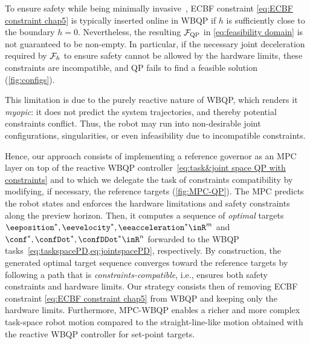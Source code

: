 To ensure  safety while being  minimally invasive~\cite{tan2021tac}, ECBF constraint \cref{eq:ECBF constraint chap5} is typically inserted online in   WBQP if $h$ is sufficiently close to the boundary $h=0$. 
Nevertheless, the resulting ${\cal F}_{\rm QP}$ in \cref{eq:feasibility domain} is not guaranteed to be non-empty. In particular, if the necessary joint deceleration required by ${\cal F}_{h}$ to ensure safety cannot be allowed by the hardware limits, these constraints are incompatible, and QP fails to find a feasible solution (\cref{fig:configs}).   

This limitation is due to the purely reactive nature of WBQP, which renders it \emph{myopic}: it does not predict the system trajectories, and thereby potential constraints conflict. Thus, the robot may run into non-desirable joint configurations, singularities, or even infeasibility due to incompatible constraints.
 

Hence, our approach consists of implementing a reference governor as an MPC layer on top of the reactive   WBQP controller~\eqref{eq:task&joint space QP with constraints} and to which we delegate the task of constraints compatibility by modifying, if necessary, the reference targets (\cref{fig:MPC-QP}). The MPC predicts the robot states and enforces the hardware limitations and safety constraints along the preview horizon. Then, it computes  a sequence of \emph{optimal} targets  $\eeposition^*,\eevelocity^*,\eeacceleration^*\inR^m$ and  $\conf^*,\confDot^*, \confDDot^*\inR^n$ forwarded to the   WBQP tasks~\cref{eq:taskspacePD,eq:jointspacePD}, respectively. By construction, the generated optimal target sequence converges toward the reference targets by following a path that is  \emph{constraints-compatible}, i.e., ensures both safety constraints and hardware limits. Our strategy consists then of removing ECBF constraint \cref{eq:ECBF constraint chap5} from WBQP and keeping only the hardware limits. 
Furthermore, MPC-WBQP enables a richer and more complex task-space robot motion compared to the straight-line-like motion obtained with the reactive  WBQP controller for set-point targets.

